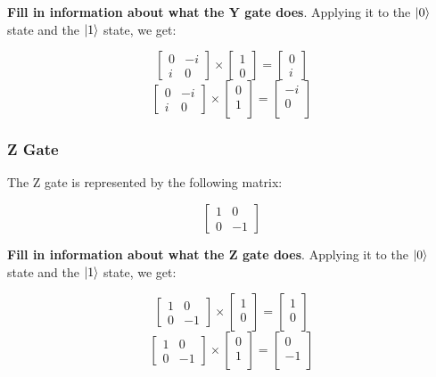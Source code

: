 \documentclass{article}
\begin{document}
\textbf{Fill in information about what the Y gate does}. Applying it to the $\ket{0}$ state and the $\ket{1}$ state, we get:

\[
	\begin{bmatrix}
		0 & -i \\
		i & 0
	\end{bmatrix}
	\times
	\begin{bmatrix}
		1 \\
		0
	\end{bmatrix}
	=
	\begin{bmatrix}
		0 \\
		i
	\end{bmatrix}
\]
\[
	\begin{bmatrix}
		0 & -i \\
		i & 0
	\end{bmatrix}
	\times
	\begin{bmatrix}
		0 \\
		1 \\
	\end{bmatrix}
	=
	\begin{bmatrix}
		-i \\
		0 \\
	\end{bmatrix}
\]

\subsubsection{Z Gate}
\label{sec:zgate}

The Z gate is represented by the following matrix:

\[
	\begin{bmatrix}
		1 & 0 \\
		0 & -1
	\end{bmatrix}
\]

\textbf{Fill in information about what the Z gate does}. Applying it to the $\ket{0}$ state and the $\ket{1}$ state, we get:

\[
	\begin{bmatrix}
		1 & 0 \\
		0 & -1
	\end{bmatrix}
	\times
	\begin{bmatrix}
		1 \\
		0 \\
	\end{bmatrix}
	=
	\begin{bmatrix}
		1 \\
		0 \\
	\end{bmatrix}
\]
\[
	\begin{bmatrix}
		1 & 0 \\
		0 & -1
	\end{bmatrix}
	\times
	\begin{bmatrix}
		0 \\
		1 \\
	\end{bmatrix}
	=
	\begin{bmatrix}
		0 \\
		-1 \\
	\end{bmatrix}
\]
\end{document}
